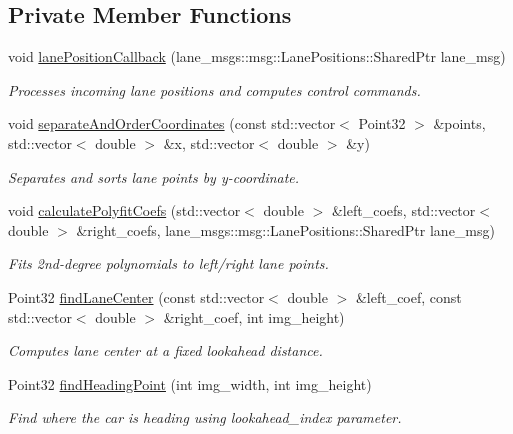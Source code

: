 \subsection*{Private Member Functions}
\begin{DoxyCompactItemize}
\item 
void \hyperlink{classMotionControlNode_a282a762671c7b667f174717ff0dcea20}{lane\+Position\+Callback} (lane\+\_\+msgs\+::msg\+::\+Lane\+Positions\+::\+Shared\+Ptr lane\+\_\+msg)
\begin{DoxyCompactList}\small\item\em Processes incoming lane positions and computes control commands. \end{DoxyCompactList}\item 
void \hyperlink{classMotionControlNode_a67cc5bcda286ffbe809d0555bdaf6a8d}{separate\+And\+Order\+Coordinates} (const std\+::vector$<$ Point32 $>$ \&points, std\+::vector$<$ double $>$ \&x, std\+::vector$<$ double $>$ \&y)
\begin{DoxyCompactList}\small\item\em Separates and sorts lane points by y-\/coordinate. \end{DoxyCompactList}\item 
void \hyperlink{classMotionControlNode_acab5e28f36d5a16521c38073077e2b1d}{calculate\+Polyfit\+Coefs} (std\+::vector$<$ double $>$ \&left\+\_\+coefs, std\+::vector$<$ double $>$ \&right\+\_\+coefs, lane\+\_\+msgs\+::msg\+::\+Lane\+Positions\+::\+Shared\+Ptr lane\+\_\+msg)
\begin{DoxyCompactList}\small\item\em Fits 2nd-\/degree polynomials to left/right lane points. \end{DoxyCompactList}\item 
Point32 \hyperlink{classMotionControlNode_a2c48d9d1ef7222d03c69f8dc86cd1842}{find\+Lane\+Center} (const std\+::vector$<$ double $>$ \&left\+\_\+coef, const std\+::vector$<$ double $>$ \&right\+\_\+coef, int img\+\_\+height)
\begin{DoxyCompactList}\small\item\em Computes lane center at a fixed lookahead distance. \end{DoxyCompactList}\item 
Point32 \hyperlink{classMotionControlNode_a9a30201e0d7cb92779f222c38804ec03}{find\+Heading\+Point} (int img\+\_\+width, int img\+\_\+height)
\begin{DoxyCompactList}\small\item\em Find where the car is heading using lookahead\+\_\+index parameter. \end{DoxyCompactList}\item 

\end{DoxyCompactItemize}
